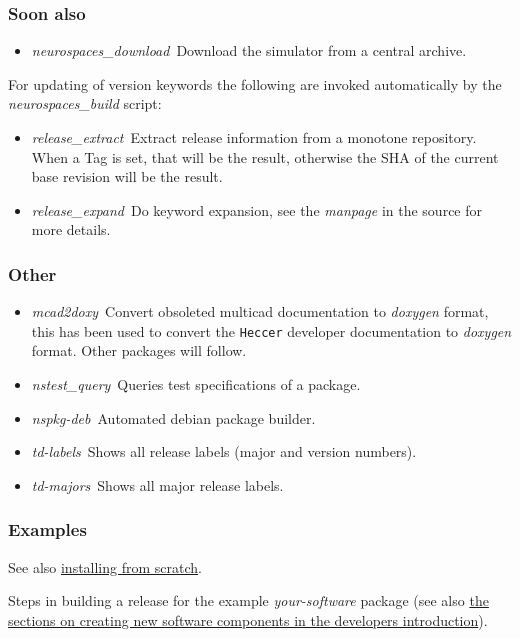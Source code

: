 \documentclass[12pt]{article}
\begin{document}
\subsubsection*{Soon also}

\begin{itemize}
	\item {\it neurospaces\_download}\,\,\,Download the simulator from a central archive.
\end{itemize}
For updating of version keywords the following are invoked automatically by the {\it neurospaces\_build} script:
\begin{itemize}
	\item {\it release\_extract}\,\,\,Extract release information from a monotone repository. When a Tag is set, that will be the result, otherwise the SHA of the current base revision will be the result.
	\item {\it release\_expand}\,\,\,Do keyword expansion, see the {\it manpage} in the source for more details. 
\end{itemize}

\subsubsection*{Other}

\begin{itemize}
\item {\it mcad2doxy}\,\,\,Convert obsoleted multicad documentation to
  {\it doxygen} format, this has been used to convert the {\tt Heccer}
  developer documentation to {\it doxygen} format. Other packages will
  follow.
\item {\it nstest\_query}\,\,\,Queries test specifications of a package.
\item {\it nspkg-deb}\,\,\,Automated debian package builder.
\item {\it td-labels}\,\,\,Shows all release labels (major and version numbers).
\item {\it td-majors}\,\,\,Shows all major release labels.
\end{itemize}

\subsubsection*{Examples}

See also
\href{../installation-developer/installation-developer.tex}{installing
  from scratch}.

Steps in building a release for the example {\it your-software}
package (see also \href{../developers-intro/developers-intro.tex}{the
  sections on creating new software components in the developers
  introduction}).
\end{document}
